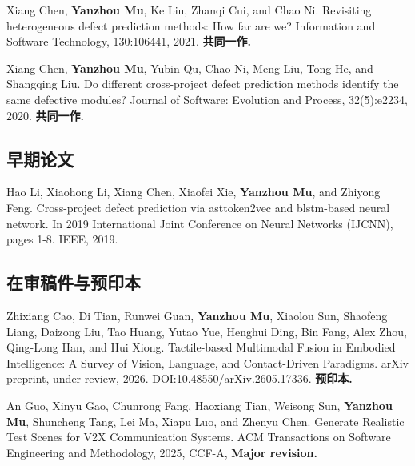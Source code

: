 \documentclass[a4paper,11pt]{article}
\begin{document}
    \vspace{2mm}
    \item {Xiang Chen, \textbf{Yanzhou Mu}, Ke Liu, Zhanqi Cui, and Chao Ni. Revisiting heterogeneous defect prediction methods: How far are we? Information and Software Technology, 130:106441, 2021. \textbf{共同一作.}}
    


    \vspace{2mm}
    \item {Xiang Chen, \textbf{Yanzhou Mu}, Yubin Qu, Chao Ni, Meng Liu, Tong He, and Shangqing Liu. Do different cross-project defect prediction methods identify the same defective modules? Journal of Software: Evolution and Process, 32(5):e2234, 2020. \textbf{共同一作.}}
    
    \subsection{\textbf{早期论文}}
    \vspace{2mm}
    \item {Hao Li, Xiaohong Li, Xiang Chen, Xiaofei Xie, \textbf{Yanzhou Mu}, and Zhiyong Feng. Cross-project defect prediction via asttoken2vec and blstm-based neural network. In 2019 International Joint Conference on Neural Networks (IJCNN), pages 1-8. IEEE, 2019.}
    
    \vspace{2mm}
    \subsection{\textbf{在审稿件与预印本}}
    
    \item {Zhixiang Cao, Di Tian, Runwei Guan, \textbf{Yanzhou Mu}, Xiaolou Sun, Shaofeng Liang, Daizong Liu, Tao Huang, Yutao Yue, Henghui Ding, Bin Fang, Alex Zhou, Qing-Long Han, and Hui Xiong. Tactile-based Multimodal Fusion in Embodied Intelligence: A Survey of Vision, Language, and Contact-Driven Paradigms. arXiv preprint, under review, 2026. DOI:10.48550/arXiv.2605.17336. \textbf{预印本.}}

    

    \vspace{2mm}
    \item {An Guo, Xinyu Gao, Chunrong Fang, Haoxiang Tian, Weisong Sun, \textbf{Yanzhou Mu}, Shuncheng Tang, Lei Ma, Xiapu Luo, and Zhenyu Chen. Generate Realistic Test Scenes for V2X Communication Systems.
    ACM Transactions on Software Engineering and Methodology, 2025, CCF-A, \textbf{Major revision.}}
     
\end{document}
